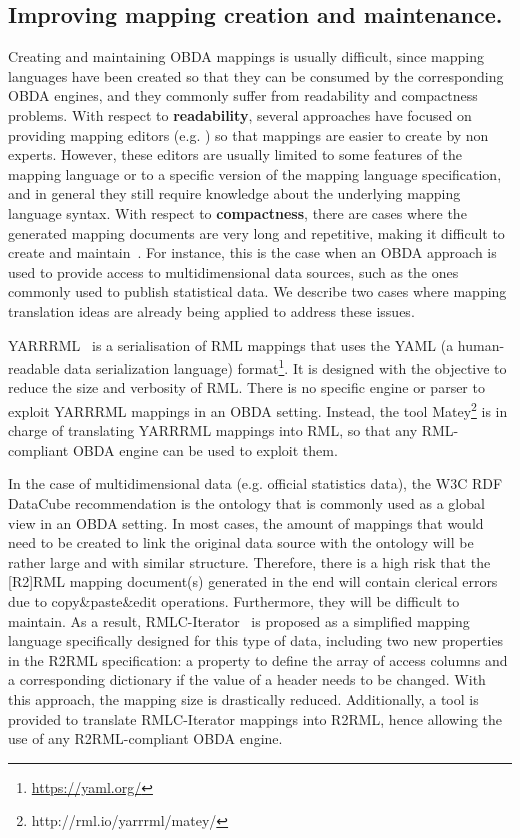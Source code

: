 \subsection{Improving mapping creation and maintenance.}

Creating and maintaining OBDA mappings is usually difficult, since mapping languages have been created so that they can be consumed by the corresponding OBDA engines, and they commonly suffer from readability and compactness problems. With respect to \textbf{readability}, several approaches have focused on providing mapping editors (e.g. \citep{heyvaert2016rmleditor}) so that mappings are easier to create by non experts. However, these editors are usually limited to some features of the mapping language or to a specific version of the mapping language specification, and in general they still require knowledge about the underlying mapping language syntax. With respect to \textbf{compactness}, there are cases where the generated mapping documents are very long and repetitive, making it difficult to create and maintain~\citep{chaves2018virtual}. For instance, this is the case when an OBDA approach is used to provide access to multidimensional data sources, such as the ones commonly used to publish statistical data. We describe two cases where mapping translation ideas are already being applied to address these issues. 

YARRRML~\citep{Heyvaert2018Declarative} is a serialisation of RML mappings that uses the YAML (a human-readable data serialization language) format\footnote{\url{https://yaml.org/}}. It is designed with the objective to reduce the size and verbosity of RML. There is no specific engine or parser to exploit YARRRML mappings in an OBDA setting. Instead, the tool Matey\footnote{http://rml.io/yarrrml/matey/} is in charge of translating YARRRML mappings into RML, so that any RML-compliant OBDA engine can be used to exploit them.

In the case of multidimensional data (e.g. official statistics data), the W3C RDF DataCube recommendation is the ontology that is commonly used as a global view in an OBDA setting. In most cases, the amount of mappings that would need to be created to link the original data source with the ontology will be rather large and with similar structure. Therefore, there is a high risk that the [R2]RML mapping document(s) generated in the end will contain clerical errors due to copy\&paste\&edit operations. Furthermore, they will be difficult to maintain. As a result, RMLC-Iterator~\citep{chaves2018virtual} is proposed as a simplified mapping language specifically designed for this type of data, including two new properties in the R2RML specification: a property to define the array of access columns and a corresponding dictionary if the value of a header needs to be changed. With this approach, the mapping size is drastically reduced. Additionally, a tool is provided to translate RMLC-Iterator mappings into R2RML, hence allowing the use of any R2RML-compliant OBDA engine.



